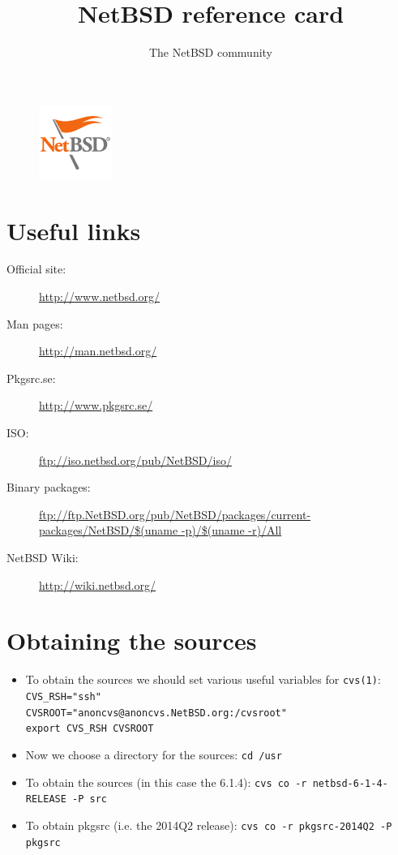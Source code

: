 \documentclass[notumble]{leaflet}
\title{NetBSD reference card}
\author{The NetBSD community}
\date{}
\newcommand{\man}[1]{\mbox{\texttt{#1}}}
\begin{document}
\begin{figure}
\centering
\includegraphics{imgs/NetBSD-flag.png}
\end{figure}

\maketitle
\thispagestyle{empty}

\section{Useful links}
\begin{description}
\item[Official site:] \url{http://www.netbsd.org/}
\item[Man pages:] \url{http://man.netbsd.org/}
\item[Pkgsrc.se:] \url{http://www.pkgsrc.se/}
\item[ISO:] \url{ftp://iso.netbsd.org/pub/NetBSD/iso/}
\item[Binary packages:] \url{ftp://ftp.NetBSD.org/pub/NetBSD/packages/current-packages/NetBSD/$(uname -p)/$(uname -r)/All}
\item[NetBSD Wiki:] \url{http://wiki.netbsd.org/}
\end{description}


\section{Obtaining the sources}
\begin{itemize}
\item To obtain the sources we should set various useful variables for
\man{cvs(1)}:
\verb|CVS_RSH="ssh"| \\
\verb|CVSROOT="anoncvs@anoncvs.NetBSD.org:/cvsroot"| \\
\verb|export CVS_RSH CVSROOT|
\item Now we choose a directory for the sources:
\verb|cd /usr|
\item To obtain the sources (in this case the 6.1.4):
\verb|cvs co -r netbsd-6-1-4-RELEASE -P src|
\item To obtain pkgsrc (i.e. the 2014Q2 release):
\verb|cvs co -r pkgsrc-2014Q2 -P pkgsrc|
\end{itemize}
\end{document}
